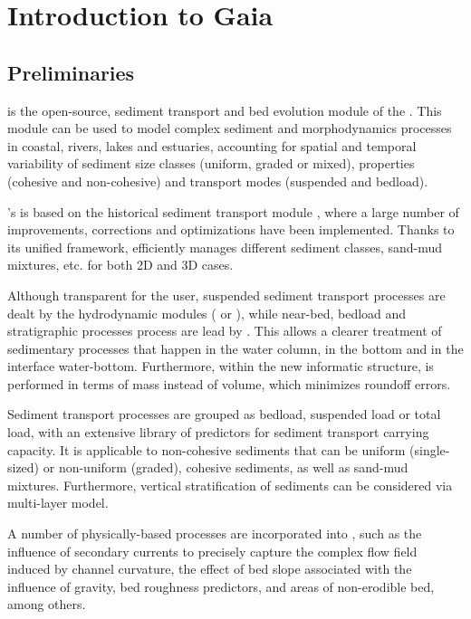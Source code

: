 \chapter[Introduction]{Introduction to Gaia}

\section{Preliminaries}
\gaia{} is the open-source, sediment transport and bed evolution module of the \telemacsystem{}. This module can be used to model complex sediment and morphodynamics processes in coastal, rivers, lakes and estuaries, accounting for spatial and temporal variability of sediment size classes (uniform, graded or mixed), properties (cohesive and non-cohesive) and transport modes (suspended and bedload).

\gaia{}'s is based on the historical sediment transport module \sisyphe{}, where a large number of improvements, corrections and optimizations have been implemented.
Thanks to its unified framework, \gaia{} efficiently manages different sediment classes, sand-mud mixtures, etc. for both 2D and 3D cases.

Although transparent for the user, suspended sediment transport processes are dealt by the hydrodynamic modules ( or ), while near-bed, bedload and stratigraphic processes process are lead by \gaia{}. This allows a clearer treatment of sedimentary processes that happen in the water column, in the bottom and in the interface water-bottom. Furthermore, within the new informatic structure, is performed in terms of mass instead of volume, which minimizes roundoff errors. 

Sediment transport processes are grouped as bedload, suspended load or total load,
with an extensive library of predictors for sediment transport carrying capacity. It is applicable to non-cohesive sediments that can be uniform (single-sized) or non-uniform
(graded), cohesive sediments, as well as sand-mud mixtures. Furthermore, vertical stratification of sediments can be considered via multi-layer model.

A number of physically-based processes are incorporated into \gaia{}, such as the influence of
secondary currents to precisely capture the complex flow field induced by channel curvature, the
effect of bed slope associated with the influence of gravity, bed roughness predictors, and areas of
non-erodible bed, among others.


